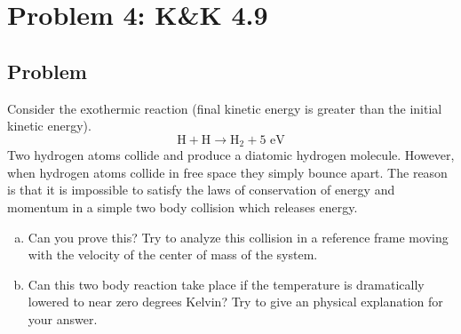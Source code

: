 \documentclass[solutions]{esg8012pset}
\begin{document}
\begin{enumerate}[a)]
\end{enumerate}
\section*{Problem 4: K\&K 4.9}
\subsection*{Problem}
  Consider the exothermic reaction (final kinetic energy is greater than the initial kinetic energy).
  $$\text{H} + \text{H} \to \text{H}_2 + 5\text{ eV}$$
  Two hydrogen atoms collide and produce a diatomic hydrogen molecule. However, when hydrogen atoms collide in free space they simply bounce apart. The reason is that it is impossible to satisfy the laws of conservation of energy and momentum in a simple two body collision which releases energy.
  \begin{enumerate}[(a)]
  \item Can you prove this? Try to analyze this collision in a reference frame moving with the velocity of the center of mass of the system.
    \item Can this two body reaction take place if the temperature is dramatically lowered to near zero degrees Kelvin? Try to give an physical explanation for your answer.
  \end{enumerate}
\end{document}
